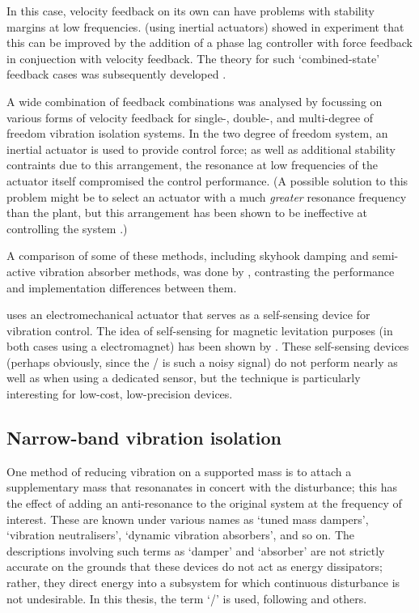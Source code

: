 In this case, velocity feedback on its own can have problems with stability margins at low frequencies.
\textcite{benassi2002-part2} (using inertial actuators) showed in experiment that this can be improved by the addition of a phase lag controller with force feedback in conjuection with velocity feedback.
The theory for such `combined-state' feedback cases was subsequently developed \cite{benassi2002-double}.

A wide combination of feedback combinations was analysed by \textcite{diaz2005} focussing on various forms of velocity feedback for single-, double-, and multi-degree of freedom vibration isolation systems.
In the two degree of freedom system, an inertial actuator is used to provide control force; as well as additional stability contraints due to this arrangement, the resonance at low frequencies of the actuator itself compromised the control performance.
(A possible solution to this problem might be to select an actuator with a much \emph{greater} resonance frequency than the plant, but this arrangement has been shown to be ineffective at controlling the system \cite[][Appendix~A]{benassi2002-part1}.)

A comparison of some of these methods, including skyhook damping and semi-active vibration absorber methods, was done by \textcite{huyanan2007}, contrasting the performance and implementation differences between them.

\textcite{paulitsch2003} uses an electromechanical actuator that serves as a self-sensing device for vibration control.
The idea of self-sensing for magnetic levitation purposes (in both cases using a electromagnet) has been shown by \textcite{bleuler1992,vischer1993}.
These self-sensing devices (perhaps obviously, since the \backemf/ is such a noisy signal) do not perform nearly as well as when using a dedicated sensor, but the technique is particularly interesting for low-cost, low-precision devices.



\subsection{Narrow-band vibration isolation}

One method of reducing vibration on a supported mass is to attach a supplementary mass that resonanates in concert with the disturbance; this has the effect of adding an anti-resonance to the original system at the frequency of interest.
These are known under various names as `tuned mass dampers', `vibration neutralisers', `dynamic vibration absorbers', and so on.
The descriptions involving such terms as `damper' and `absorber' are not strictly accurate on the grounds that these devices do not act as energy dissipators; rather, they direct energy into a subsystem for which continuous disturbance is not undesirable.
In this thesis, the term `\vibneut/' is used, following \textcite{kidner1998} and others.

